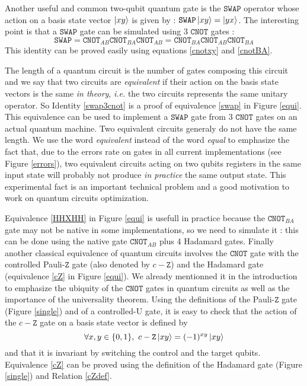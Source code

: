 \documentclass[a4paper,12pt,fleqn]{article}
\newcommand\swap{\mathtt{SWAP}}
\newcommand\cnot{\mathtt{CNOT}}
\newcommand\cZ{c-\mathtt{Z}}
\newcommand\PauliZ{ Pauli-$\mathtt Z$ }
\begin{document}
Another useful and common two-qubit quantum gate is the $\swap$ operator whose action on a basis state vector $\ket{xy}$ is given by : $\swap\ket{xy}=\ket{yx}$.
The interesting point is that a $\swap$ gate can be simulated using 3 $\cnot$ gates :
\begin{equation}\label{swap3cnot}
\swap=\cnot_{AB}\cnot_{BA}\cnot_{AB}=\cnot_{BA}\cnot_{AB}\cnot_{BA}
\end{equation}
This identity can be proved easily using equations \eqref{cnotxy} and \eqref{cnotBA}.
\medskip

The length of a quantum circuit is the number of gates composing this circuit and 
we say that two circuits are \emph{equivalent} if their action on the basis state vectors is the same \emph{in theory}, \textit{i.e.} the two circuits represents 
the same unitary operator.  So Identity \eqref{swap3cnot} is a proof of 
equivalence \eqref{swap} in Figure \ref{equi}. This equivalence can be used to implement a $\swap$ gate from  3 $\cnot$ gates on an actual quantum machine. 
Two equivalent circuits generaly do not have the same length. We use the word \emph{equivalent} instead of the word \emph{equal} to emphasize the fact that, due to the errors rate on gates in all current implementations (see Figure \ref{errors}), two equivalent circuits acting on two qubits registers in the same input state will probably not produce \emph{in practice} the same output state. This experimental fact is an important technical problem and a good motivation to work on quantum circuits optimization.

Equivalence \eqref{HHXHH} in Figure \ref{equi} is usefull in practice because the $\cnot_{BA}$ gate may not be native in some implementations, so we need  to simulate it : this can be done using the native gate $\cnot_{AB}$ plus 4 Hadamard gates. Finally another classical equivalence of quantum circuits involves the $\cnot$ gate with the controlled \PauliZ gate (also denoted by $\cZ$) and the Hadamard gate (equivalence \eqref{cZ} in Figure \ref{equi}). We already mentionned it in the introduction  to emphasize the ubiquity of the $\cnot$ gates in quantum circuits as well as the importance of the universality theorem.  Using the definitions of the \PauliZ gate (Figure \ref{single}) and of a controlled-U gate, it is easy to check that the action of the $\cZ$ gate on a basis state vector is defined by
\begin{equation}\label{cZdef}
\forall x,y\in\{0,1\},\   \cZ \ket{xy}=(-1)^{xy}\ket{xy}
\end{equation}
and that it is invariant by switching the control and the target qubits. Equivalence \eqref{cZ} can be proved using the definition of the Hadamard gate (Figure \ref{single}) and Relation \eqref{cZdef}. 
\end{document}
